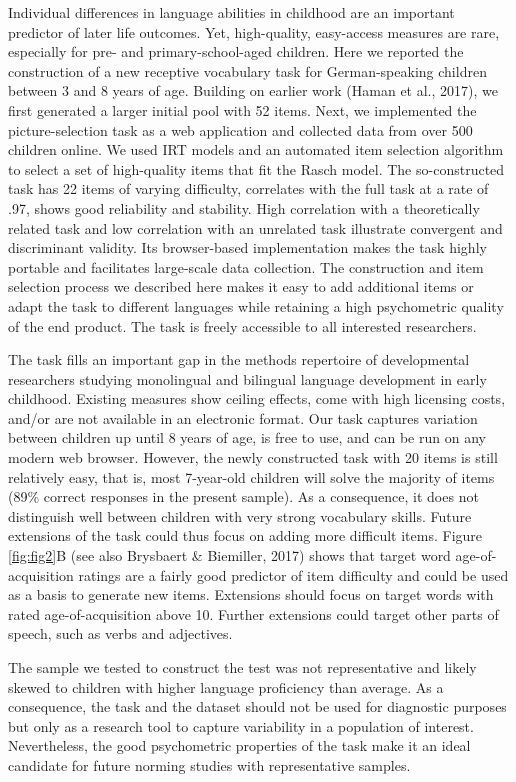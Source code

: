 \documentclass[
  man,floatsintext]{apa6}
\begin{document}
Individual differences in language abilities in childhood are an important predictor of later life outcomes. Yet, high-quality, easy-access measures are rare, especially for pre- and primary-school-aged children. Here we reported the construction of a new receptive vocabulary task for German-speaking children between 3 and 8 years of age. Building on earlier work (Haman et al., 2017), we first generated a larger initial pool with 52 items. Next, we implemented the picture-selection task as a web application and collected data from over 500 children online. We used IRT models and an automated item selection algorithm to select a set of high-quality items that fit the Rasch model. The so-constructed task has 22 items of varying difficulty, correlates with the full task at a rate of .97, shows good reliability and stability. High correlation with a theoretically related task and low correlation with an unrelated task illustrate convergent and discriminant validity. Its browser-based implementation makes the task highly portable and facilitates large-scale data collection. The construction and item selection process we described here makes it easy to add additional items or adapt the task to different languages while retaining a high psychometric quality of the end product. The task is freely accessible to all interested researchers.

The task fills an important gap in the methods repertoire of developmental researchers studying monolingual and bilingual language development in early childhood. Existing measures show ceiling effects, come with high licensing costs, and/or are not available in an electronic format. Our task captures variation between children up until 8 years of age, is free to use, and can be run on any modern web browser. However, the newly constructed task with 20 items is still relatively easy, that is, most 7-year-old children will solve the majority of items (89\% correct responses in the present sample). As a consequence, it does not distinguish well between children with very strong vocabulary skills. Future extensions of the task could thus focus on adding more difficult items. Figure \ref{fig:fig2}B (see also Brysbaert \& Biemiller, 2017) shows that target word age-of-acquisition ratings are a fairly good predictor of item difficulty and could be used as a basis to generate new items. Extensions should focus on target words with rated age-of-acquisition above 10. Further extensions could target other parts of speech, such as verbs and adjectives.

The sample we tested to construct the test was not representative and likely skewed to children with higher language proficiency than average. As a consequence, the task and the dataset should not be used for diagnostic purposes but only as a research tool to capture variability in a population of interest. Nevertheless, the good psychometric properties of the task make it an ideal candidate for future norming studies with representative samples.
\end{document}

